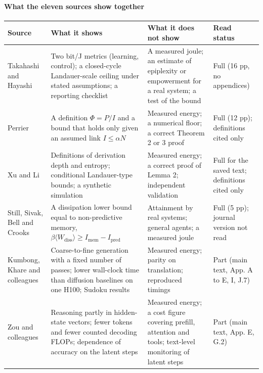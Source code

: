 \documentclass[
  10pt,
]{article}
\newcounter{none} %
\begin{document}
\paragraph{What the eleven sources show
together}\label{what-the-eleven-sources-show-together}

{\def\LTcaptype{none} %
\begin{longtable}[]{@{}
  >{\raggedright\arraybackslash}p{}
  >{\raggedright\arraybackslash}p{}
  >{\raggedright\arraybackslash}p{}
  >{\raggedright\arraybackslash}p{}@{}}
\toprule\noalign{}
\begin{minipage}[b]{\linewidth}\raggedright
Source
\end{minipage} & \begin{minipage}[b]{\linewidth}\raggedright
What it shows
\end{minipage} & \begin{minipage}[b]{\linewidth}\raggedright
What it does not show
\end{minipage} & \begin{minipage}[b]{\linewidth}\raggedright
Read status
\end{minipage} \\
\midrule\noalign{}
\endhead
\bottomrule\noalign{}
\endlastfoot
Takahashi and Hayashi & Two bit/J metrics (learning, control); a
closed-cycle Landauer-scale ceiling under stated assumptions; a
reporting checklist & A measured joule; an estimate of epiplexity or
empowerment for a real system; a test of the bound & Full (16 pp, no
appendices) \\
Perrier & A definition \(\Phi = P/I\) and a bound that holds only given
an assumed link \(I \le \alpha N\) & Measured energy; a numerical floor;
a correct Theorem 2 or 3 proof & Full (12 pp); definitions cited only \\
Xu and Li & Definitions of derivation depth and entropy; conditional
Landauer-type bounds; a synthetic simulation & Measured energy; a
correct proof of Lemma 2; independent validation & Full for the saved
text; definitions cited only \\
Still, Sivak, Bell and Crooks & A dissipation lower bound equal to
non-predictive memory,
\(\beta\langle W_{\mathrm{diss}}\rangle \ge I_{\mathrm{mem}} - I_{\mathrm{pred}}\)
& Attainment by real systems; general agents; a measured joule & Full (5
pp); journal version not read \\
Kumbong, Khare and colleagues & Coarse-to-fine generation with a fixed
number of passes; lower wall-clock time than diffusion baselines on one
H100; Sudoku results & Measured energy; parity on translation;
reproduced timings & Part (main text, App. A to E, I, J.7) \\
Zou and colleagues & Reasoning partly in hidden-state vectors; fewer
tokens and fewer counted decoding FLOPs; dependence of accuracy on the
latent steps & Measured energy; a cost figure covering prefill,
attention and tools; text-level monitoring of latent steps & Part (main
text, App. E, G.2) \\
\end{longtable}
}
\end{document}
